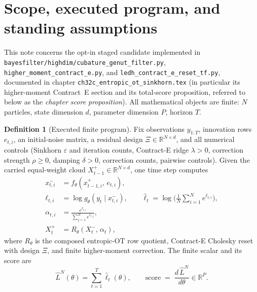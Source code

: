 \documentclass[11pt]{article}
\theoremstyle{definition}
\newtheorem{definition}[proposition]{Definition}
\theoremstyle{remark}
\begin{document}
\section{Scope, executed program, and standing assumptions}
\label{sec:gsv-scope}

This note concerns the opt-in staged candidate implemented in
\texttt{bayesfilter/highdim/cubature\_genut\_filter.py},
\texttt{higher\_moment\_contract\_e.py}, and
\texttt{ledh\_contract\_e\_reset\_tf.py}, documented in chapter
\texttt{ch32c\_entropic\_ot\_sinkhorn.tex} (in particular its higher-moment
Contract~E section and its total-score proposition, referred to below as the
\emph{chapter score proposition}).  All mathematical objects are finite:
$N$ particles, state dimension $d$, parameter dimension $P$, horizon $T$.

\begin{definition}[Executed finite program]
\label{def:gsv-program}
Fix observations $y_{1:T}$, innovation rows $e_{t,i}$, an initial-noise
matrix, a residual design $\Xi\in\mathbb{R}^{N\times d}$, and all numerical
controls (Sinkhorn $\varepsilon$ and iteration counts, Contract-E ridge
$\lambda>0$, correction strength $\rho\ge 0$, damping $\delta>0$, correction
counts, pairwise controls).  Given the carried equal-weight cloud
$X_{t-1}^{+}\in\mathbb{R}^{N\times d}$, one time step computes
\begin{align}
 x_{t,i}^{-} &= f_\theta\!\left(x_{t-1,i}^{+},\,e_{t,i}\right),
 \label{eq:gsv-transition}\\
 \ell_{t,i} &= \log g_\theta\!\left(y_t \mid x_{t,i}^{-}\right),
 \qquad
 \widehat\ell_t = \log\!\Big(\tfrac1N\textstyle\sum_{i=1}^N
 e^{\ell_{t,i}}\Big),
 \label{eq:gsv-increment}\\
 \alpha_{t,i} &= \frac{e^{\ell_{t,i}}}{\sum_{j=1}^N e^{\ell_{t,j}}},
 \label{eq:gsv-weights}\\
 X_t^{+} &= R_\theta\!\left(X_t^{-},\,\alpha_t\right),
 \label{eq:gsv-reset}
\end{align}
where $R_\theta$ is the composed entropic-OT row quotient, Contract-E
Cholesky reset with design $\Xi$, and finite higher-moment correction.  The
finite scalar and its score are
\begin{equation}
\label{eq:gsv-scalar}
 \widehat L^N(\theta)=\sum_{t=1}^T \widehat\ell_t(\theta),
 \qquad
 \text{score} \;=\; \frac{d\,\widehat L^N}{d\theta}\in\mathbb{R}^{P}.
\end{equation}
\end{definition}
\end{document}
